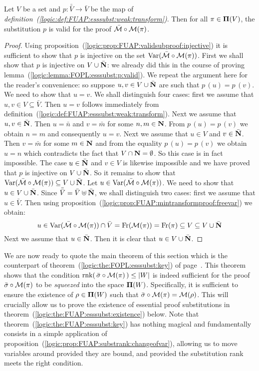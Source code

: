 \begin{lemma}\label{logic:lemma:FUAP:esssubst:p:valid}
Let $V$ be a set and $p:\bar{\bar{V}}\to\bar{V}$ be the map of {\em
definition~(\ref{logic:def:FUAP:esssubst:weak:transform})}. Then for
all $\pi\in\mbox{${\bf\Pi}(V)$}$, the substitution $p$ is valid for the proof
$\bar{\cal M}\circ{\cal M}(\pi)$.
\end{lemma}
\begin{proof}
Using proposition~(\ref{logic:prop:FUAP:validsubproof:injective}) it
is sufficient to show that $p$ is injective on the set
$\mbox{\rm Var}(\bar{\cal M}\circ{\cal M}(\pi))$. First we shall show that $p$
is injective on $V\cup\bar{\mbox{$\bf N$}}$: we already did this in the course
of proving lemma~(\ref{logic:lemma:FOPL:esssubst:p:valid}). We
repeat the argument here for the reader's convenience: so suppose
$u,v\in V\cup\bar{\mbox{$\bf N$}}$ are such that $p\,(u)=p\,(v)$. We need to
show that $u=v$. We shall distinguish four cases: first we assume
that $u,v\in V\subseteq\bar{V}$. Then $u=v$ follows immediately from
definition~(\ref{logic:def:FUAP:esssubst:weak:transform}). Next we
assume that $u,v\in\bar{\mbox{$\bf N$}}$. Then $u=\bar{n}$ and $v=\bar{m}$ for
some $n,m\in\mbox{$\bf N$}$. From $p\,(u)=p\,(v)$ we obtain $n=m$ and
consequently $u=v$. Next we assume that $u\in V$ and $v\in\bar{\mbox{$\bf N$}}$.
Then $v=\bar{m}$ for some $m\in\mbox{$\bf N$}$ and from the equality
$p\,(u)=p\,(v)$ we obtain $u=n$ which contradicts the fact that
$V\cap\mbox{$\bf N$}=\emptyset$. So this case is in fact impossible. The case
$u\in\bar{\mbox{$\bf N$}}$ and $v\in V$ is likewise impossible and we have
proved that $p$ is injective on $V\cup\bar{\mbox{$\bf N$}}$. So it remains to
show that $\mbox{\rm Var}(\bar{\cal M}\circ{\cal M}(\pi))\subseteq
V\cup\bar{\mbox{$\bf N$}}$. Let $u\in\mbox{\rm Var}(\bar{\cal M}\circ{\cal M}(\pi))$. We
need to show that $u\in V\cup\bar{\mbox{$\bf N$}}$. Since
$\bar{\bar{V}}=\bar{V}\uplus\bar{\mbox{$\bf N$}}$, we shall distinguish two
cases: first we assume that $u\in\bar{V}$. Then using
proposition~(\ref{logic:prop:FUAP:mintransformproof:freevar}) we
obtain:
    \[
    u\in\mbox{\rm Var}(\bar{\cal M}\circ{\cal
    M}(\pi))\cap\bar{V}=\mbox{\rm Fr}({\cal M}(\pi))=\mbox{\rm Fr}(\pi)\subseteq
    V\subseteq V\cup\bar{\mbox{$\bf N$}}
    \]
Next we assume that $u\in\bar{\mbox{$\bf N$}}$. Then it is clear that $u\in
V\cup\bar{\mbox{$\bf N$}}$.
\end{proof}

We are now ready to quote the main theorem of this section which is
the counterpart of theorem~(\ref{logic:the:FOPL:esssubst:key}) of
page~\pageref{logic:the:FOPL:esssubst:key}. This theorem shows that
the condition $\mbox{\rm rnk}(\,\bar{\sigma}\circ{\cal M}(\pi)\,)\leq|W|$ is
indeed sufficient for the proof $\bar{\sigma}\circ{\cal M}(\pi)$ to
be {\em squeezed} into the space ${\bf \Pi}(W)$. Specifically, it is
sufficient to ensure the existence of $\rho\in{\bf\Pi}(W)$ such that
$\bar{\sigma}\circ{\cal M}(\pi)={\cal M}(\rho)$. This will crucially
allow us to prove the existence of essential proof substitutions in
theorem~(\ref{logic:the:FUAP:esssubst:existence}) below. Note that
theorem~(\ref{logic:the:FUAP:esssubst:key}) has nothing magical and
fundamentally consists in a simple application of
proposition~(\ref{logic:prop:FUAP:substrank:changeofvar}), allowing
us to move variables around provided they are bound, and provided
the substitution rank meets the right condition.

